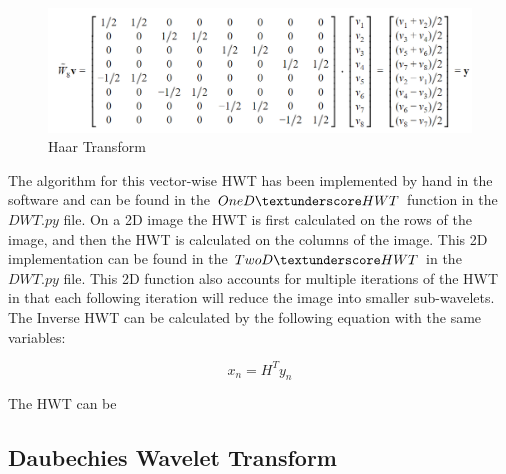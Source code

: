 \documentclass{article}
\begin{document}
 \begin{figure}[h!]
 	\centering
	\includegraphics[width=\linewidth]{../../1_Resources/images/Haar_matrix_8.png}
	\caption{Haar Transform}
 	\label{fig:Haar_Forward}
 \end{figure}
 
 The algorithm for this vector-wise HWT has been implemented by hand in the software and can be found in the $OneD\textunderscore HWT$ function in the $DWT.py$ file. On a 2D image the HWT is first calculated on the rows of the image, and then the HWT is calculated on the columns of the image. This 2D implementation can be found in the $TwoD\textunderscore HWT$ in the $DWT.py$ file. This 2D function also accounts for multiple iterations of the HWT in that each following iteration will reduce the image into smaller sub-wavelets.  
 The Inverse HWT can be calculated by the following equation with the same variables:
 
 \begin{equation}\label{eqn:Inverse_HWT}
 x_{n} = H^Ty_{n}
 \end{equation}
 
 The HWT can be 
 
\subsection{Daubechies Wavelet Transform}
\end{document}
